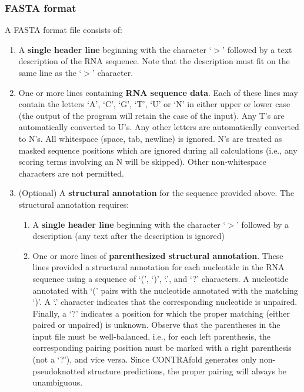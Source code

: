 \documentclass{article}
\begin{document}
  \subsubsection{FASTA format}
  \label{sec:fasta}

  A FASTA format file consists of:
  \begin{enumerate}
  \item A \textbf{single header line} beginning with the character `$>$' followed by
    a text description of the RNA sequence.  Note that the description
    must fit on the same line as the `$>$' character.
  \item One or more lines containing \textbf{RNA sequence data}.  Each
    of these lines may contain the letters `A', `C', `G', `T', `U' or
    `N' in either upper or lower case (the output of the program will
    retain the case of the input).  Any T's are automatically
    converted to U's.  Any other letters are automatically converted
    to N's.  All whitespace (space, tab, newline) is ignored.  N's are
    treated as masked sequence positions which are ignored during all
    calculations (i.e., any scoring terms involving an N will be
    skipped).  Other non-whitespace characters are not permitted.
  \item (Optional) A \textbf{structural annotation} for the sequence provided above.  
    The structural annotation requires:
    \begin{enumerate}
    \item A \textbf{single header line} beginning
      with the character `$>$' followed by a description (any text after the
      description is ignored)
    \item One or more lines of \textbf{parenthesized structural
      annotation}.  These lines provided a structural annotation for
      each nucleotide in the RNA sequence using a sequence of `(',
      `)', `.', and `?' characters.  A nucleotide annotated with `('
      pairs with the nucleotide annotated with the matching `)'.  A
      `.' character indicates that the corresponding nucleotide is
      unpaired.  Finally, a `?' indicates a position for which the
      proper matching (either paired or unpaired) is unknown.  Observe
      that the parentheses in the input file must be well-balanced,
      i.e., for each left parenthesis, the corresponding pairing
      position must be marked with a right parenthesis (not a `?'),
      and vice versa.  Since CONTRAfold generates only
      non-pseudoknotted structure predictions, the proper pairing will
      always be unambiguous.
    \end{enumerate}
  \end{enumerate}
\end{document}

